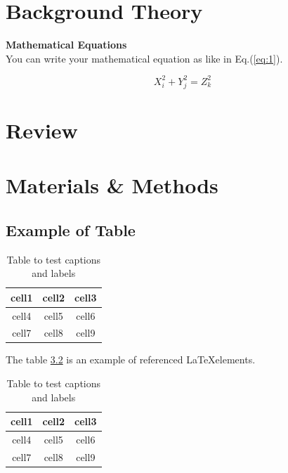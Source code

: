 \documentclass[12pt]{report}
\begin{document}
\newpage

\chapter{Background Theory}

{\bf Mathematical Equations}\\

You can write your mathematical equation as like in Eq.(\ref{eq:1}).

\begin{equation}
\label{eq:1}
X_{i}^{2}+Y_{j}^{2}=Z_{k}^{2}
\end{equation}


\newpage

\chapter{Review}

\newpage
\chapter{Materials \& Methods}
\section{Example of Table}



\begin{table}[h]
\centering
\caption{Table to test captions and labels}
\label{table:1}
\begin{tabular}{ |c| c| c| }
\hline
 cell1 & cell2 & cell3 \\ 
 \hline
 cell4 & cell5 & cell6 \\ 
 \hline 
 cell7 & cell8 & cell9   \\ 
 \hline
\end{tabular}

\end{table}




The table \ref{table:2} is an example of referenced \LaTeX elements.
\begin{table}
\centering
\caption{Table to test captions and labels}
\label{table:2}
\begin{tabular}{ |c| c| c| }
\hline
 cell1 & cell2 & cell3 \\ 
 \hline
 cell4 & cell5 & cell6 \\ 
 \hline 
 cell7 & cell8 & cell9   \\ 
 \hline
\end{tabular}

\end{table}
\end{document}

